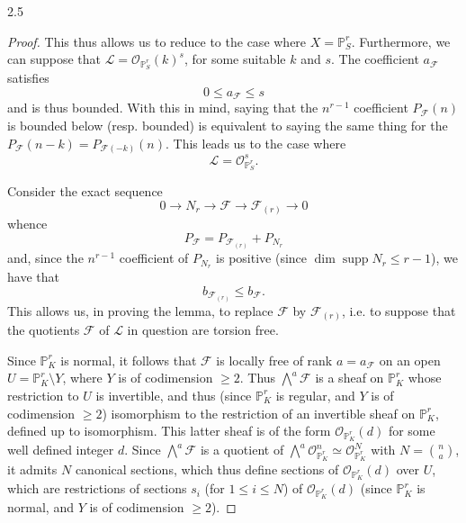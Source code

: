 \begin{lemma}{2.5}
\begin{proof}
      This thus allows us to reduce to the case where \(X=\mathbb {P}_S^r\).
      Furthermore, we can suppose that \(\mathscr {L}=\mathcal {O}_{\mathbb {P}_S^r}(k)^s\), for some suitable \(k\) and \(s\).
      The coefficient \(a_\mathscr {F}\) satisfies
      \[         0\leqslant  a_\mathscr {F} \leqslant  s       \]
      and is thus bounded.
      With this in mind, saying that the \(n^{r-1}\) coefficient \(P_\mathscr {F}(n)\) is bounded below (resp. bounded) is equivalent to saying the same thing for the \(P_\mathscr {F}(n-k)=P_{\mathscr {F}(-k)}(n)\).
      This leads us to the case where
      \[         \mathscr {L}         = \mathcal {O}_{\mathbb {P}_S^r}^s.       \]\par{}Consider the exact sequence
      \[         0 \to  N_r \to  \mathscr {F} \to  \mathscr {F}_{(r)} \to  0       \]
      whence
      \[         P_\mathscr {F}         = P_{\mathscr {F}_{(r)}} + P_{N_r}       \]
      and, since the \(n^{r-1}\) coefficient of \(P_{N_r}\) is positive (since \(\dim \operatorname {supp} N_r\leqslant  r-1\)), we have that
      \[         b_{\mathscr {F}_{(r)}} \leqslant  b_\mathscr {F}.       \]
      This allows us, in proving the lemma, to replace \(\mathscr {F}\) by \(\mathscr {F}_{(r)}\), i.e. to suppose that the quotients \(\mathscr {F}\) of \(\mathscr {L}\) in question are torsion free.\par{}Since \(\mathbb {P}_K^r\) is normal, it follows that \(\mathscr {F}\) is locally free of rank \(a=a_\mathscr {F}\) on an open \(U=\mathbb {P}_K^r\setminus  Y\), where \(Y\) is of codimension \(\geqslant 2\).
      Thus \(\bigwedge ^a\mathscr {F}\) is a sheaf on \(\mathbb {P}_K^r\) whose restriction to \(U\) is invertible, and thus (since \(\mathbb {P}_K^r\) is regular, and \(Y\) is of codimension \(\geqslant 2\)) isomorphism to the restriction of an invertible sheaf on \(\mathbb {P}_K^r\), defined up to isomorphism.
      This latter sheaf is of the form \(\mathcal {O}_{\mathbb {P}_K^r}(d)\) for some well defined integer \(d\).
      Since \(\bigwedge ^a\mathscr {F}\) is a quotient of \(\bigwedge ^a\mathcal {O}_{\mathbb {P}_K^r}^n\simeq \mathcal {O}_{\mathbb {P}_K^r}^N\) with \(N=\binom {n}{a}\), it admits \(N\) canonical sections, which thus define sections of \(\mathcal {O}_{\mathbb {P}_K^r}(d)\) over \(U\), which are restrictions of sections \(s_i\) (for \(1\leqslant  i\leqslant  N\)) of \(\mathcal {O}_{\mathbb {P}_K^r}(d)\) (since \(\mathbb {P}_K^r\) is normal, and \(Y\) is of codimension \(\geqslant 2\)).
      

\end{proof}
\end{lemma}
